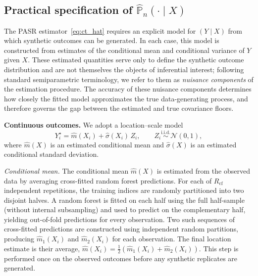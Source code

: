 \documentclass[11pt]{article}
\theoremstyle{plain}
\theoremstyle{definition}
\theoremstyle{remark}
\begin{document}
\subsection{Practical specification of $\widehat{\mathbb P}_n(\cdot\mid X)$}
\label{subsec:practical_specification}

The PASR estimator~\eqref{eq:ct_hat} requires an explicit model for $(Y \mid X)$ from which synthetic outcomes can be generated. In each case, this model is constructed from estimates of the conditional mean and conditional variance of $Y$ given $X$. These estimated quantities serve only to define the synthetic outcome distribution and are not themselves the objects of inferential interest; following standard semiparametric terminology, we refer to them as \emph{nuisance components} of the estimation procedure. The accuracy of these nuisance components determines how closely the fitted model approximates the true data-generating process, and therefore governs the gap between the estimated and true covariance floors.

\medskip
\noindent\textbf{Continuous outcomes.}
We adopt a location--scale model
\[
Y_i^\star = \hat m(X_i) + \hat\sigma(X_i)\,Z_i, \qquad Z_i\stackrel{\text{i.i.d.}}{\sim}\mathcal N(0,1),
\]
where $\hat m(X)$ is an estimated conditional mean and $\hat\sigma(X)$ is an estimated conditional standard deviation.

\medskip
\noindent\textit{Conditional mean.}\quad
The conditional mean $\hat m(X)$ is estimated from the observed data by averaging cross-fitted random forest predictions. For each of $R_{\mathrm{cf}}$ independent repetitions, the training indices are randomly partitioned into two disjoint halves. A random forest is fitted on each half using the full half-sample (without internal subsampling) and used to predict on the complementary half, yielding out-of-fold predictions for every observation. Two such sequences of cross-fitted predictions are constructed using independent random partitions, producing $\hat m_1(X_i)$ and $\hat m_2(X_i)$ for each observation. The final location estimate is their average, $\hat m(X_i) = \tfrac{1}{2}(\hat m_1(X_i) + \hat m_2(X_i))$. This step is performed once on the observed outcomes before any synthetic replicates are generated.
\end{document}
